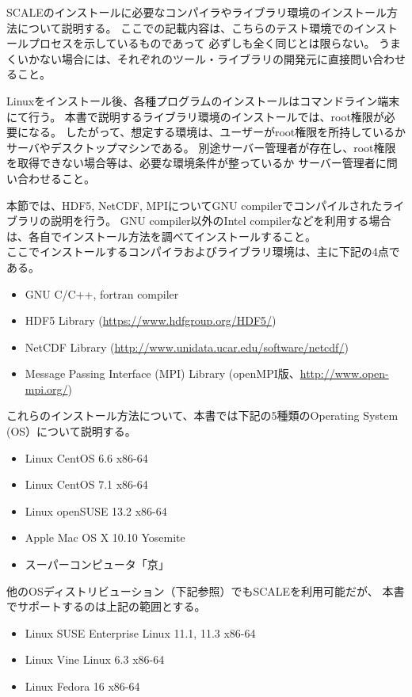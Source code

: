 
SCALEのインストールに必要なコンパイラやライブラリ環境のインストール方法について説明する。
ここでの記載内容は、こちらのテスト環境でのインストールプロセスを示しているものであって
必ずしも全く同じとは限らない。
うまくいかない場合には、それぞれのツール・ライブラリの開発元に直接問い合わせること。


Linuxをインストール後、各種プログラムのインストールはコマンドライン端末にて行う。
本書で説明するライブラリ環境のインストールでは、root権限が必要になる。
したがって、想定する環境は、ユーザーがroot権限を所持しているかサーバやデスクトップマシンである。
別途サーバー管理者が存在し、root権限を取得できない場合等は、必要な環境条件が整っているか
サーバー管理者に問い合わせること。

本節では、HDF5, NetCDF, MPIについてGNU compilerでコンパイルされたライブラリの説明を行う。
GNU compiler以外のIntel compilerなどを利用する場合は、各自でインストール方法を調べてインストールすること。\\

\noindent ここでインストールするコンパイラおよびライブラリ環境は、主に下記の4点である。
\begin{itemize}
\item GNU C/C++, fortran compiler
\item HDF5 Library (\url{https://www.hdfgroup.org/HDF5/})
\item NetCDF Library (\url{http://www.unidata.ucar.edu/software/netcdf/})
\item Message Passing Interface (MPI) Library (openMPI版、\url{http://www.open-mpi.org/})
\end{itemize}
これらのインストール方法について、本書では下記の5種類のOperating System (OS）について説明する。
\begin{itemize}
\item Linux CentOS 6.6 x86-64
\item Linux CentOS 7.1 x86-64
\item Linux openSUSE 13.2 x86-64
\item Apple Mac OS X 10.10 Yosemite
\item スーパーコンピュータ「京」
\end{itemize}
他のOSディストリビューション（下記参照）でもSCALEを利用可能だが、
本書でサポートするのは上記の範囲とする。\\

\begin{itemize}
\item Linux SUSE Enterprise Linux 11.1, 11.3 x86-64
\item Linux Vine Linux 6.3 x86-64
\item Linux Fedora 16 x86-64
\end{itemize}


